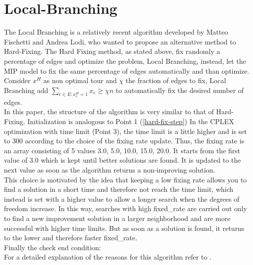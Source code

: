 \section{Local-Branching}
The Local Branching is a relatively recent algorithm developed by Matteo Fischetti and Andrea Lodi, who wanted to propose an alternative method to Hard-Fixing. The Hard Fixing method, as stated above, fix randomly a percentage of edges and optimize the problem, Local Branching, instead, let the MIP model to fix the same percentage of edges automatically and than optimize. \\
Consider $ x^H $ as non optimal tour and $ \chi $ the fraction of edges to fix, Local Branching add $ \sum_{ e\in E: x_e^H = 1 } x_e \ge \chi n $ to automatically fix the desired number of edges. \\ 
In this paper, the structure of the algorithm is very similar to that of Hard-Fixing. Initialization is analogous to Point 1 (\ref{hard-fix-step})
In the CPLEX optimization with time limit (Point 3), the time limit is a little higher and is set to 300 according to the choice of the fixing rate update. Thus, the fixing rate is an array consisting of 5 values {3.0, 5.0, 10.0, 15.0, 20.0}. It starts from the first value of 3.0 which is kept until better solutions are found. It is updated to the next value as soon as the algorithm returns a non-improving solution. \\
This choice is motivated by the idea that keeping a low fixing rate allows you to find a solution in a short time and therefore not reach the time limit, which instead is set with a higher value to allow a longer search when the degrees of freedom increase.
In this way, searches with high fixed\_rate are carried out only to find a new improvement solution in a larger neighborhood and are more successful with higher time limits. But as soon as a solution is found, it returns to the lower and therefore faster fixed\_rate.\\
Finally the check end condition: \\
For a detailed explanation of the reasons for this algorithm refer to \cite{article}.


